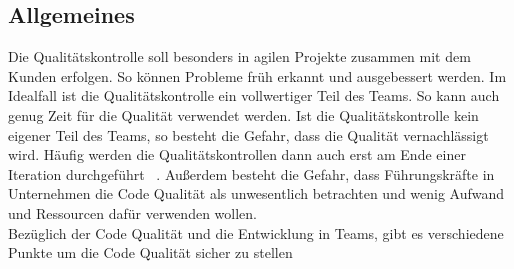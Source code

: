\subsection{Allgemeines}
Die Qualitätskontrolle soll besonders in agilen Projekte zusammen mit dem Kunden erfolgen. So können Probleme früh erkannt und ausgebessert werden. Im Idealfall ist die Qualitätskontrolle ein vollwertiger Teil des Teams. So kann auch genug Zeit für die Qualität verwendet werden. Ist die Qualitätskontrolle kein eigener Teil des Teams, so besteht die Gefahr, dass die Qualität vernachlässigt wird. Häufig werden die Qualitätskontrollen dann auch erst am Ende einer Iteration durchgeführt ~\parencite[vgl. 180-182]{ecksteinTeams}. Außerdem besteht die Gefahr, dass Führungskräfte in Unternehmen die Code Qualität als unwesentlich betrachten und wenig Aufwand und Ressourcen dafür verwenden wollen. \\
Bezüglich der Code Qualität und die Entwicklung in Teams, gibt es verschiedene Punkte um die Code Qualität sicher zu stellen ~\parencite{verwijsTeams}
